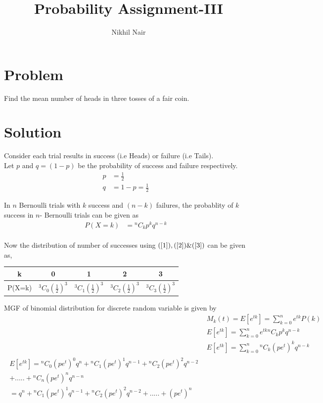 \documentclass[journal,12pt,twocolumn]{IEEEtran}
\title{\mytitle}
\title{
Probability Assignment-III
}
\author{Nikhil Nair}
\begin{document}
\maketitle
\bigskip


\section{\textbf{Problem }}
Find the mean number of heads in three tosses of a fair coin.


\section{\textbf{Solution }}
Consider each trial results in success (i.e Heads) or failure (i.e Tails).
\\
 
Let $p$ and $q = (1 - p)$ be the probability of success and failure respectively.
\begin{align}
p &= \frac{1}{2}&               \label{1}
\\            
q &= 1 - p = \frac{1}{2}&       \label{2}
\end{align}

In $n$ Bernoulli trials with $k$ success and $(n - k)$ failures, the probablity of $k$ success in $n$- Bernoulli trials can be given as\\
\begin{align}
P(X =k) &= {}^nC_kp^{k} q^{n-k}&             \label{3}
\end{align}
\\

Now the distribution of number of successes using $(\ref{1}),(\ref{2}) \& (\ref{3})$ can be given as,
\begin{center}
\begin{tabular}{ |c |c |c |c |c |}
 \hline
 k  &  0 &  1  &  2 & 3\\
 \hline
 P(X=k)  &  $^3C_0(\frac{1}{2})^{3}$  & $^3C_1(\frac{1}{2})^{3}$  &  $^3C_2(\frac{1}{2})^{3}$ & $^3C_3(\frac{1}{2})^{3}$\\
 \hline
\end{tabular}
\end{center}

MGF of binomial distribution for discrete random variable is given by
\\
\begin{align}
&M_k(t) = E[e^{tk}] = \sum_{k=0}^{n} e^{tk} P(k)&
\\
&E[e^{tk}] = \sum_{k=0}^{n} e^{tk} {}^nC_kp^{k} q^{n-k}&
\\
&E[e^{tk}] = \sum_{k=0}^{n} {}^nC_k (pe^t)^{k} q^{n-k}&
\\
\begin{split}
E[e^{tk}] = {}^nC_0 (pe^t)^{0} q^{n} + {}^nC_1 (pe^t)^{1} q^{n-1} + {}^nC_2 (pe^t)^{2} q^{n-2} \\+.....+ {}^nC_n (pe^t)^{n} q^{n-n}
\\
=  q^{n} + {}^nC_1 (pe^t)^{1} q^{n-1} + {}^nC_2 (pe^t)^{2} q^{n-2}+.....+ (pe^t)^{n}                   \label{7}
\end{split}
\end{align}
\\
\end{document}

